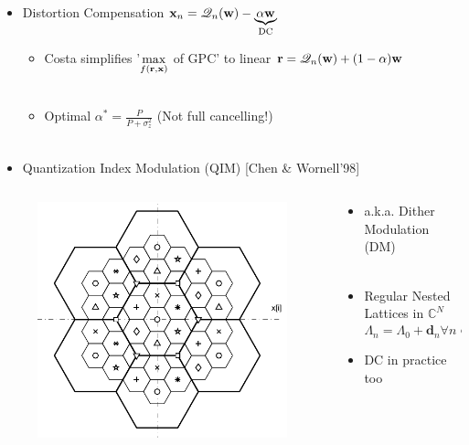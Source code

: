 \documentclass[xcolor=dvipsnames,aspectratio=169]{beamer}
\begin{document}
{\begin{itemize}
\begin{itemize}
\begin{equation}
         \begin{split}
            R&=\log_2 N_Q=\log_2\frac{2^{\Inf{\y}{\rr}}}{2^{\Inf{\rr}{\w}}}=\Inf{\y}{\rr}-\Inf{\rr}{\w}
         \end{split}
        \end{equation}
     \end{itemize}
     \pagebreak
     \item Distortion Compensation $\mathbf{x}_{n}=\mathscr{Q}_{n}(\mathbf{w})-\underset{\textnormal{DC}}{\underbrace{\alpha\mathbf{w}}}$
     \begin{itemize}
        \item Costa simplifies '$\displaystyle \max_{f(\mathbf{r},\mathbf{x})}$ of GPC' to linear $\mathbf{r}=\mathscr{Q}_{n}(\mathbf{w})+(1-\alpha)\mathbf{w}$\\ \ \\
        \item Optimal $\alpha^*=\frac{P}{P+\sigma_z^2}$ (Not full cancelling!)\\ \ \\
     \end{itemize}
     \item Quantization Index Modulation (QIM) [Chen \& Wornell'98]
    \end{itemize}
    \begin{columns}[T]
      \begin{column}{6cm}
       \begin{figure}
        \centering
        \includegraphics[width=.6\columnwidth]{lattice}
        \end{figure}
      \end{column}
      \begin{column}{6cm}
       \begin{itemize}
        \item a.k.a. Dither Modulation (DM)    \\ \ \\
        \item Regular Nested Lattices in $\mathbb{C}^{N}$
        $$\Lambda_n=\Lambda_0+\mathbf{d}_n \forall n\in\{0,2^{R}\}$$
        \item DC in practice too
     \end{itemize}
      \end{column}
     \end{columns}
}
\end{document}
